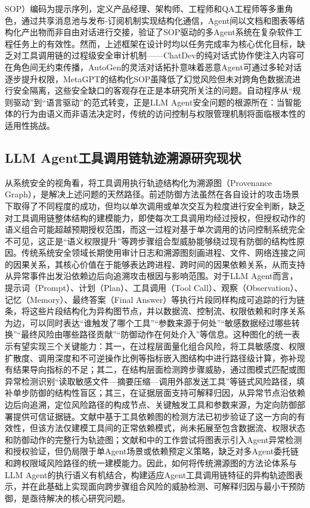 SOP）编码为提示序列，定义产品经理、架构师、工程师和QA工程师等多重角色，通过共享消息池与发布-订阅机制实现结构化通信，Agent间以文档和图表等结构化产出物而非自由对话进行交接，验证了SOP驱动的多Agent系统在复杂软件工程任务上的有效性。然而，上述框架在设计时均以任务完成率为核心优化目标，缺乏对工具调用链的过程级安全审计机制——ChatDev的纯对话式协作使注入内容可在角色间无约束传播，AutoGen的灵活对话拓扑意味着恶意Agent可通过多轮对话逐步提升权限，MetaGPT的结构化SOP虽降低了幻觉风险但未对跨角色数据流进行安全隔离，这些安全缺口的客观存在正是本研究所关注的问题。自动程序从“规则驱动”到“语言驱动”的范式转变，正是LLM Agent安全问题的根源所在：当智能体的行为由语义而非语法决定时，传统的访问控制与权限管理机制将面临根本性的适用性挑战\cite{chu2026systematic}。

\subsection{LLM Agent工具调用链轨迹溯源研究现状}

从系统安全的视角看，将工具调用执行轨迹结构化为溯源图（Provenance Graph），是解决上述问题的天然路径。前述防御方法虽然在各自设计的攻击场景下取得了不同程度的成功，但均以单次调用或单次交互为粒度进行安全判断，缺乏对工具调用链整体结构的建模能力，即使每次工具调用均经过授权，但授权动作的语义组合可能超越预期授权范围，而这一过程对基于单次调用的访问控制系统完全不可见，这正是“语义权限提升”等跨步骤组合型威胁能够绕过现有防御的结构性原因\cite{chu2026systematic}。传统系统安全领域长期使用审计日志和溯源图刻画进程、文件、网络连接之间的因果关系\cite{gao2021threatraptor,cheng2024kairos,inam2023sok}，其核心价值在于能够表达跨进程、跨时间的因果依赖关系，从而支持从异常事件出发沿依赖边后向追溯攻击根因与影响范围。对于LLM Agent而言，提示词（Prompt）、计划（Plan）、工具调用（Tool Call）、观察（Observation）、记忆（Memory）、最终答案（Final Answer）等执行片段同样构成可追踪的行为链条，将这些片段结构化为异构图节点，并以数据流、控制流、权限依赖和时序关系为边，可以同时表达“谁触发了哪个工具”“参数来源于何处”“敏感数据经过哪些转换”“最终风险由哪些路径贡献”“防御动作在何处介入”等信息。这种图化的统一表示有望实现三个关键能力：其一，在过程层面量化组合风险，将工具敏感度、权限扩散度、调用深度和不可逆操作比例等指标嵌入图结构中进行路径级计算，弥补现有结果导向指标的不足；其二，在结构层面检测跨步骤威胁，通过图模式匹配或图异常检测识别“读取敏感文件—摘要压缩—调用外部发送工具”等链式风险路径，填补单步防御的结构性盲区；其三，在证据层面支持可解释归因，从异常节点沿依赖边后向追溯，定位风险路径的构成节点、关键触发工具和参数来源，为定向防御部署提供可信证据链\cite{wang2026fromagenttraces,dewitt2026openchallenges}。文献\cite{an2025ipiguard}中基于工具依赖图的检测方法已初步验证了这一方向的有效性，但该方法仅建模工具间的正常依赖模式，尚未拓展至包含数据流、权限状态和防御动作的完整行为轨迹图；文献\cite{he2025sentinelagent}和\cite{wang2026authgraph}中的工作尝试将图表示引入Agent异常检测和授权验证，但仍局限于单Agent场景或依赖预定义策略，缺乏对多Agent委托链和跨权限域风险路径的统一建模能力。因此，如何将传统溯源图的方法论体系与LLM Agent的执行语义有机结合，构建适应Agent工具调用链特征的异构轨迹图表示，并在此基础上实现面向跨步骤组合风险的威胁检测、可解释归因与最小干预防御，是亟待解决的核心研究问题。

